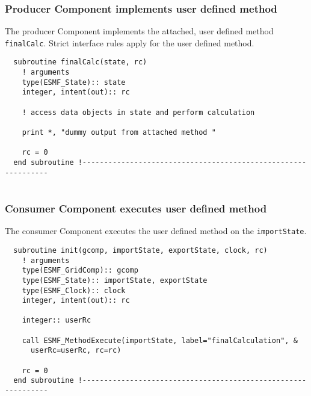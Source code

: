 
  \subsubsection{Producer Component implements user defined method}
        
    The producer Component implements the attached, user defined method
    {\tt finalCalc}. Strict interface rules apply for the user defined
    method. 

 \begin{verbatim}
  subroutine finalCalc(state, rc)
    ! arguments
    type(ESMF_State):: state
    integer, intent(out):: rc

    ! access data objects in state and perform calculation
    
    print *, "dummy output from attached method "

    rc = 0
  end subroutine !--------------------------------------------------------------
 
\end{verbatim}
 

  \subsubsection{Consumer Component executes user defined method}
        
    The consumer Component executes the user defined method on the
    {\tt importState}.
   

 \begin{verbatim}
  subroutine init(gcomp, importState, exportState, clock, rc)
    ! arguments
    type(ESMF_GridComp):: gcomp
    type(ESMF_State):: importState, exportState
    type(ESMF_Clock):: clock
    integer, intent(out):: rc
    
    integer:: userRc
    
    call ESMF_MethodExecute(importState, label="finalCalculation", &
      userRc=userRc, rc=rc)

    rc = 0
  end subroutine !--------------------------------------------------------------
 
\end{verbatim}

\setlength{\parskip}{\oldparskip}
\setlength{\parindent}{\oldparindent}
\setlength{\baselineskip}{\oldbaselineskip}
